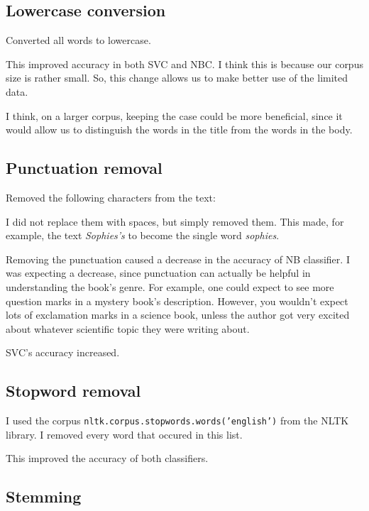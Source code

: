 \subsection{Lowercase conversion}
\label{sec:lowercase}

Converted all words to lowercase.

This improved accuracy in both SVC and NBC. I think this is because our corpus size is rather small. So, this change allows us to make better use of the limited data.

I think, on a larger corpus, keeping the case could be more beneficial, since it would allow us to distinguish the words in the title from the words in the body.

\subsection{Punctuation removal}
\label{sec:punctuation}

Removed the following characters from the text:


I did not replace them with spaces, but simply removed them. This made, for example, the text \emph{Sophies's} to become the single word \emph{sophies}.

Removing the punctuation caused a decrease in the accuracy of NB classifier. I was expecting a decrease, since punctuation can actually be helpful in understanding the book's genre. For example, one could expect to see more question marks in a mystery book's description. However, you wouldn't expect lots of exclamation marks in a science book, unless the author got very excited about whatever scientific topic they were writing about.

SVC's accuracy increased.

\subsection{Stopword removal}
\label{sec:stopwords}

I used the corpus \texttt{nltk.corpus.stopwords.words('english')} from the NLTK library. I removed every word that occured in this list.

This improved the accuracy of both classifiers.

\subsection{Stemming}
\label{sec:stemming}

